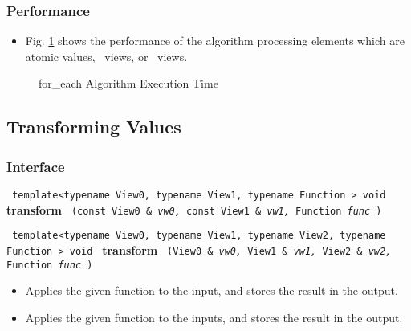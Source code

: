 \subsubsection{Performance} %

\begin{itemize}
\item
Fig. \ref{fig:foreach-alg-exec-exper}
shows the performance of the algorithm processing
elements which are atomic values, \stl\ views, or \stapl\ views.
\end{itemize}

\begin{figure}[p]
\caption{for\_each Algorithm Execution Time}
\label{fig:foreach-alg-exec-exper}
\end{figure}


\subsection{Transforming Values} \label{sec-muta-transform}

\subsubsection{Interface} %

\noindent
\texttt{%
template<typename View0, typename View1, typename Function >
\newline
void 
}
\newline
\textbf{transform}%
\texttt{%
(const View0 \&
\textit{vw0,}%
const View1 \&
\textit{vw1,}%
Function 
\textit{func}%
)
}
\vspace{0.4cm}

\noindent
\texttt{%
template<typename View0, typename View1, typename View2, typename Function >
\newline
void 
}
\newline
\textbf{transform}%
\texttt{%
(View0 \&
\textit{vw0,}%
View1 \&
\textit{vw1,}%
View2 \&
\textit{vw2,}%
Function 
\textit{func}%
)
}

\begin{itemize}
\item
Applies the given function to the input, and stores the result in the output. 
\item
Applies the given function to the inputs, and stores the result in the output. 
\end{itemize}
 
